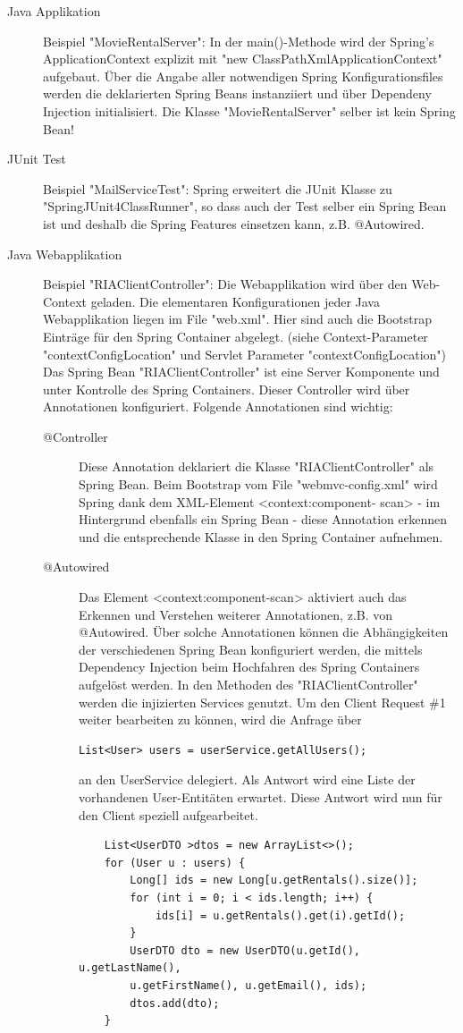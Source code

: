 \documentclass[a4paper,10pt]{scrreprt}
\begin{document}
\begin{description}
\item[Java Applikation]
Beispiel "MovieRentalServer": In der main()-Methode wird der Spring's ApplicationContext
explizit mit "new ClassPathXmlApplicationContext" aufgebaut. Über die Angabe aller
notwendigen Spring Konfigurationsfiles werden die deklarierten Spring Beans instanziiert und
über Dependeny Injection initialisiert. Die Klasse "MovieRentalServer" selber ist kein Spring
Bean!

\item[JUnit Test]
Beispiel "MailServiceTest": Spring erweitert die JUnit Klasse zu "SpringJUnit4ClassRunner",
so dass auch der Test selber ein Spring Bean ist und deshalb die Spring Features einsetzen
kann, z.B. @Autowired.
\item[Java Webapplikation]
Beispiel "RIAClientController": Die Webapplikation wird über den Web-Context geladen. Die
elementaren Konfigurationen jeder Java Webapplikation liegen im File "web.xml". Hier sind
auch die Bootstrap Einträge für den Spring Container abgelegt. (siehe Context-Parameter
"contextConfigLocation" und Servlet Parameter "contextConfigLocation")
Das Spring Bean "RIAClientController" ist eine Server Komponente und unter Kontrolle des Spring
Containers. Dieser Controller wird über Annotationen konfiguriert. Folgende Annotationen sind
wichtig:
\begin{description}

\item[@Controller]
Diese Annotation deklariert die Klasse "RIAClientController" als Spring Bean. Beim Bootstrap
vom File "webmvc-config.xml" wird Spring dank dem XML-Element <context:component-
scan> - im Hintergrund ebenfalls ein Spring Bean - diese Annotation erkennen und die
entsprechende Klasse in den Spring Container aufnehmen.
\item[@Autowired]
Das Element <context:component-scan> aktiviert auch das Erkennen und Verstehen weiterer
Annotationen, z.B. von @Autowired. Über solche Annotationen können die Abhängigkeiten
der verschiedenen Spring Bean konfiguriert werden, die mittels Dependency Injection beim
Hochfahren des Spring Containers aufgelöst werden.
In den Methoden des "RIAClientController" werden die injizierten Services genutzt. Um den Client
Request \#1 weiter bearbeiten zu können, wird die Anfrage über
\begin{verbatim}
List<User> users = userService.getAllUsers(); 
\end{verbatim}
an den UserService delegiert. Als Antwort wird eine Liste der vorhandenen User-Entitäten erwartet.
Diese Antwort wird nun für den Client speziell aufgearbeitet.
\begin{lstlisting}
	List<UserDTO >dtos = new ArrayList<>();
	for (User u : users) {
		Long[] ids = new Long[u.getRentals().size()];
		for (int i = 0; i < ids.length; i++) {
			ids[i] = u.getRentals().get(i).getId();
		}
		UserDTO dto = new UserDTO(u.getId(), u.getLastName(),
		u.getFirstName(), u.getEmail(), ids);
		dtos.add(dto);
	}
\end{lstlisting}


\end{description}
\end{description}
\end{document}
